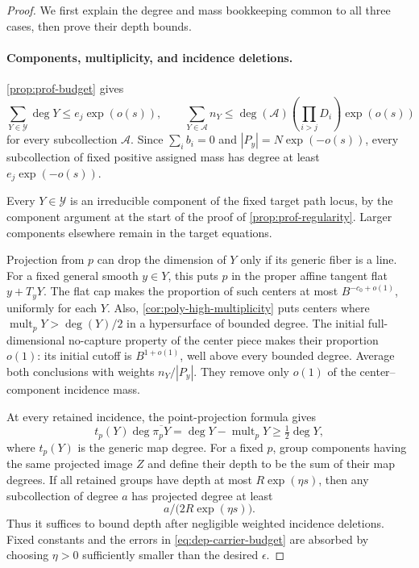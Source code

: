 \begin{proof}
We first explain the degree and mass bookkeeping common to all three cases, then prove their depth bounds.

\paragraph{Components, multiplicity, and incidence deletions.}
\cref{prop:prof-budget} gives
\begin{equation}\label{eq:dep-carrier-budget}
 \sum_{Y\in\mathcal{Y}}\deg Y\le e_j\exp(o(s)),
 \qquad
 \sum_{Y\in\mathcal{A}} n_Y
 \le \deg(\mathcal{A})\left(\prod_{i>j}D_i\right)\exp(o(s))
\end{equation}
for every subcollection $\mathcal{A}$. Since $\sum_i b_i=0$ and $|P_y|=N\exp(-o(s))$, every subcollection of fixed positive assigned mass has degree at least $e_j\exp(-o(s))$.

Every $Y\in\mathcal{Y}$ is an irreducible component of the fixed target path locus, by the component argument at the start of the proof of \cref{prop:prof-regularity}. Larger components elsewhere remain in the target equations.

Projection from $p$ can drop the dimension of $Y$ only if its generic fiber is a line. For a fixed general smooth $y\in Y$, this puts $p$ in the proper affine tangent flat $y+T_yY$. The flat cap makes the proportion of such centers at most $B^{-c_0+o(1)}$, uniformly for each $Y$. Also, \cref{cor:poly-high-multiplicity} puts centers where $\operatorname{mult}_pY>\deg(Y)/2$ in a hypersurface of bounded degree. The initial full-dimensional no-capture property of the center piece makes their proportion $o(1)$: its initial cutoff is $B^{1+o(1)}$, well above every bounded degree. Average both conclusions with weights $n_Y/|P_y|$. They remove only $o(1)$ of the center--component incidence mass.

At every retained incidence, the point-projection formula gives
\begin{equation}\label{eq:dep-projection-formula}
 t_p(Y)\deg\overline{\pi_pY}
       =\deg Y-\operatorname{mult}_pY
       \ge\tfrac12\deg Y,
\end{equation}
where $t_p(Y)$ is the generic map degree. For a fixed $p$, group components having the same projected image $Z$ and define their depth to be the sum of their map degrees. If all retained groups have depth at most $R\exp(\eta s)$, then any subcollection of degree $a$ has projected degree at least
\begin{equation}\label{eq:dep-depth-to-degree}
 a\big/\bigl(2R\exp(\eta s)\bigr).
\end{equation}
Thus it suffices to bound depth after negligible weighted incidence deletions. Fixed constants and the errors in \eqref{eq:dep-carrier-budget} are absorbed by choosing $\eta>0$ sufficiently smaller than the desired $\epsilon$.


\end{proof}
